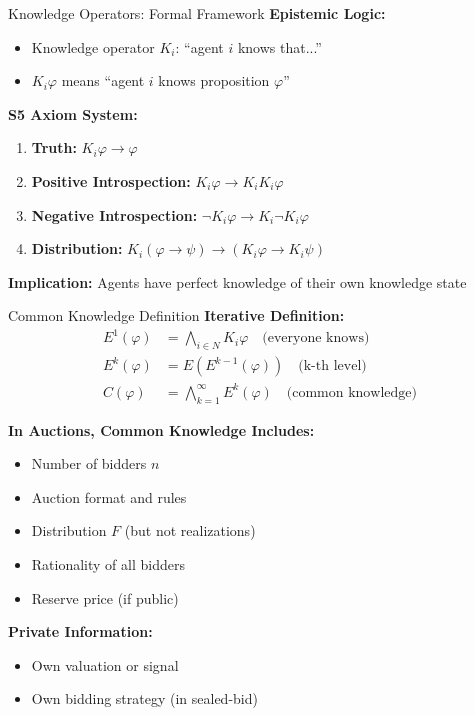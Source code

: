 \documentclass[xcolor={x11names}, aspectratio=169 ]{beamer}
\begin{document}
\begin{frame}{Knowledge Operators: Formal Framework}
\textbf{Epistemic Logic:}
\begin{itemize}
  \item Knowledge operator $K_i$: ``agent $i$ knows that...''
  \item $K_i \varphi$ means ``agent $i$ knows proposition $\varphi$''
\end{itemize}

\textbf{S5 Axiom System:}
\begin{enumerate}
  \item \textbf{Truth:} $K_i \varphi \rightarrow \varphi$
  \item \textbf{Positive Introspection:} $K_i \varphi \rightarrow K_i K_i \varphi$
  \item \textbf{Negative Introspection:} $\neg K_i \varphi \rightarrow K_i \neg K_i \varphi$
  \item \textbf{Distribution:} $K_i(\varphi \rightarrow \psi) \rightarrow (K_i \varphi \rightarrow K_i \psi)$
\end{enumerate}

\textbf{Implication:} Agents have perfect knowledge of their own knowledge state
\end{frame}

\begin{frame}{Common Knowledge Definition}
\textbf{Iterative Definition:}
\begin{align*}
E^1(\varphi) &= \bigwedge_{i \in N} K_i \varphi \quad \text{(everyone knows)} \\
E^k(\varphi) &= E(E^{k-1}(\varphi)) \quad \text{(k-th level)} \\
C(\varphi) &= \bigwedge_{k=1}^{\infty} E^k(\varphi) \quad \text{(common knowledge)}
\end{align*}

\textbf{In Auctions, Common Knowledge Includes:}
\begin{itemize}
  \item Number of bidders $n$
  \item Auction format and rules
  \item Distribution $F$ (but not realizations)
  \item Rationality of all bidders
  \item Reserve price (if public)
\end{itemize}

\textbf{Private Information:}
\begin{itemize}
  \item Own valuation or signal
  \item Own bidding strategy (in sealed-bid)
\end{itemize}
\end{frame}
\end{document}
